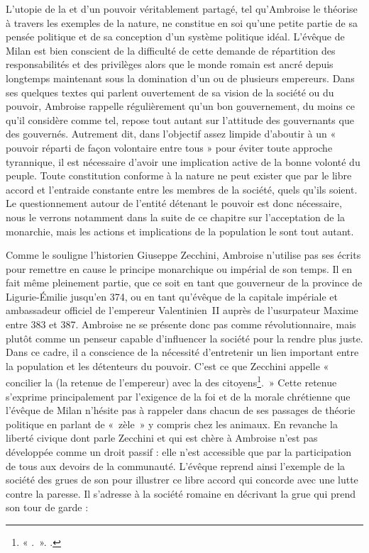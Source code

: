 L'utopie de la  et d'un pouvoir véritablement partagé, tel qu'Ambroise le théorise à travers les exemples de la nature, ne constitue en soi qu'une petite partie de sa pensée politique et de sa conception d'un système politique idéal. L'évêque de Milan est bien conscient de la difficulté de cette demande de répartition des responsabilités et des privilèges alors que le monde romain est ancré depuis longtemps maintenant sous la domination d'un ou de plusieurs empereurs. Dans ses quelques textes qui parlent ouvertement de sa vision de la société ou du pouvoir, Ambroise rappelle régulièrement qu'un bon gouvernement, du moins ce qu'il considère comme tel, repose tout autant sur l'attitude des gouvernants que des gouvernés. Autrement dit, dans l'objectif assez limpide d'aboutir à un « pouvoir réparti de façon volontaire entre tous » pour éviter toute approche tyrannique, il est nécessaire d'avoir une implication active de la bonne volonté du peuple. Toute constitution conforme à la nature ne peut exister que par le libre accord et l'entraide constante entre les membres de la société, quels qu'ils soient. Le questionnement autour de l'entité détenant le pouvoir est donc nécessaire, nous le verrons notamment dans la suite de ce chapitre sur l'acceptation de la monarchie, mais les actions et implications de la population le sont tout autant.

\bigskip

Comme le souligne l'historien Giuseppe Zecchini, Ambroise n'utilise pas ses écrits pour remettre en cause le principe monarchique ou impérial de son temps. Il en fait même pleinement partie, que ce soit en tant que gouverneur de la province de Ligurie-Émilie jusqu'en 374, ou en tant qu'évêque de la capitale impériale et ambassadeur officiel de l'empereur Valentinien~II auprès de l'usurpateur Maxime entre 383 et 387. Ambroise ne se présente donc pas comme révolutionnaire, mais plutôt comme un penseur capable d'influencer la société pour la rendre plus juste. Dans ce cadre, il a conscience de la nécessité d'entretenir un lien important entre la population et les détenteurs du pouvoir. C'est ce que Zecchini appelle « concilier la  (la retenue de l'empereur) avec la  des citoyens\footnote{« .~». \cite[164]{zecchini_pensiero_politico}.}.~» Cette retenue s'exprime principalement par l'exigence de la foi et de la morale chrétienne que l'évêque de Milan n'hésite pas à rappeler dans chacun de ses passages de théorie politique en parlant de «~zèle~» y compris chez les animaux. En revanche la liberté civique dont parle Zecchini et qui est chère à Ambroise n'est pas développée comme un droit passif : elle n'est accessible que par la participation de tous aux devoirs de la communauté. L'évêque reprend ainsi l'exemple de la société des grues de son  pour illustrer ce libre accord qui concorde avec une lutte contre la paresse. Il s'adresse à la société romaine en décrivant la grue qui prend son tour de garde :


